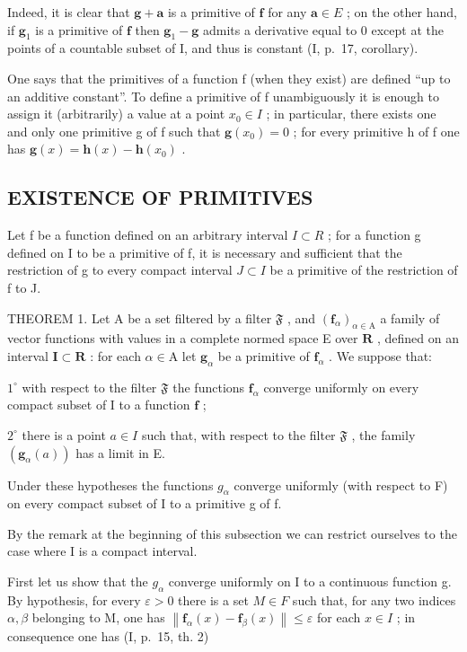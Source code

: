 Indeed, it is clear that \(\mathbf{g} + \mathbf{a}\) is a primitive of \(\mathbf{f}\) for any \(\mathbf{a} \in E\) ; on the other hand, if \(\mathbf{g}_1\) is a primitive of \(\mathbf{f}\) then \(\mathbf{g}_1 - \mathbf{g}\) admits a derivative equal to 0 except at the points of a countable subset of I, and thus is constant (I, p.~17, corollary).

One says that the primitives of a function f (when they exist) are defined ``up to an additive constant''. To define a primitive of f unambiguously it is enough to assign it (arbitrarily) a value at a point \(x_{0} \in I\) ; in particular, there exists one and only one primitive g of f such that \(\mathbf{g}(x_{0}) = 0\) ; for every primitive h of f one has \(\mathbf{g}(x) = \mathbf{h}(x) - \mathbf{h}(x_{0})\) .

\subsection{EXISTENCE OF PRIMITIVES}

Let f be a function defined on an arbitrary interval \(I \subset R\) ; for a function g defined on I to be a primitive of f, it is necessary and sufficient that the restriction of g to every compact interval \(J \subset I\) be a primitive of the restriction of f to J.

THEOREM 1. Let A be a set filtered by a filter \(\mathfrak{F}\) , and \((\mathbf{f}_{\alpha})_{\alpha \in \mathrm{A}}\) a family of vector functions with values in a complete normed space E over \(\mathbf{R}\) , defined on an interval \(\mathbf{I} \subset \mathbf{R}\) : for each \(\alpha \in \mathrm{A}\) let \(\mathbf{g}_{\alpha}\) be a primitive of \(\mathbf{f}_{\alpha}\) . We suppose that:

\(1^{\circ}\) with respect to the filter \(\mathfrak{F}\) the functions \(\mathbf{f}_{\alpha}\) converge uniformly on every compact subset of I to a function \(\mathbf{f}\) ;

\(2^{\circ}\) there is a point \(a \in I\) such that, with respect to the filter \(\mathfrak{F}\) , the family \((\mathbf{g}_{\alpha}(a))\) has a limit in E.

Under these hypotheses the functions \(g_{\alpha}\) converge uniformly (with respect to F) on every compact subset of I to a primitive g of f.

By the remark at the beginning of this subsection we can restrict ourselves to the case where I is a compact interval.

First let us show that the \(g_{\alpha}\) converge uniformly on I to a continuous function g. By hypothesis, for every \(\varepsilon > 0\) there is a set \(M \in F\) such that, for any two indices \(\alpha, \beta\) belonging to M, one has \(\left\|\mathbf{f}_{\alpha}(x) - \mathbf{f}_{\beta}(x)\right\| \leqslant \varepsilon\) for each \(x \in I\) ; in consequence one has (I, p.~15, th. 2)

